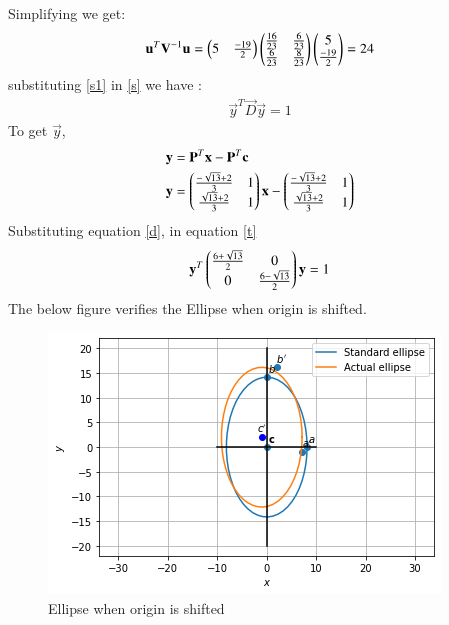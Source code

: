 \documentclass[journal,12pt,twocolumn]{IEEEtran}
\begin{document}
Simplifying we get:
\begin{align}\label{s1}
\mathbf{u}^T\mathbf{V}^{-1}\mathbf{u}=
\begin{pmatrix}
5 &\frac{-19}{2}
\end{pmatrix}
\begin{pmatrix}
\frac{16}{23} & \frac{6}{23}\\
\frac{6}{23} & \frac{8}{23}
\end{pmatrix}
\begin{pmatrix}
5\\\frac{-19}{2}
\end{pmatrix}
=24
\end{align}
substituting \eqref{s1} in \eqref{s} we have :
\begin{align}\label{t}
 \vec{y}^T\vec{D}\vec{y}=1  
\end{align}
To get $\vec{y}$,
\begin{align}
\mathbf{y}&=\mathbf{P}^T\mathbf{x}-\mathbf{P}^T\mathbf{c}\\
    \mathbf{y}&=\begin{pmatrix}\frac{-\sqrt{13}+2}{3} & 1 \\ \frac{\sqrt{13}+2}{3} & 1\end{pmatrix}
    \mathbf{x}-\begin{pmatrix}\frac{-\sqrt{13}+2}{3} & 1\\ \frac{\sqrt{13}+2}{3} & 1\end{pmatrix}
\end{align}
Substituting  equation \eqref{d}, in equation \eqref{t} 
\begin{align}
    \mathbf{y}^T \begin{pmatrix}
    \frac{6+\sqrt{13}}{2} & 0\\
     0 &\frac{6-\sqrt{13}}{2}
    \end{pmatrix}\mathbf{y}=1
\end{align}
The below figure verifies the Ellipse when origin is shifted.
\renewcommand{\thefigure}{1}
\begin{figure}[h]
    \centering
    \includegraphics[width=\columnwidth]{Assignment 6.png}
    \caption{Ellipse when origin is shifted}
    \label{Fig :1}
\end{figure}
\end{document}
